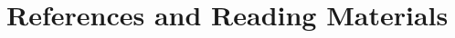 \section{References and Reading Materials}

\begin{frame}[allowframebreaks]
    
    
    \nocite{*} %
\end{frame}